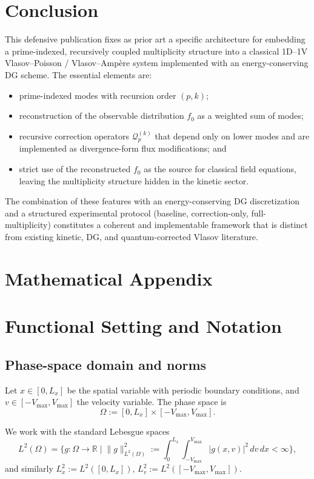 \documentclass[11pt]{article}
\begin{document}
\section{Conclusion}

This defensive publication fixes as prior art a specific architecture for
embedding a prime-indexed, recursively coupled multiplicity structure into a
classical 1D--1V Vlasov–Poisson / Vlasov–Amp\`ere system implemented with an
energy-conserving DG scheme. The essential elements are:
\begin{itemize}
  \item prime-indexed modes with recursion order $(p,k)$;
  \item reconstruction of the observable distribution $f_0$ as a weighted sum
        of modes;
  \item recursive correction operators $\mathcal{Q}_p^{(k)}$ that depend only
        on lower modes and are implemented as divergence-form flux
        modifications; and
  \item strict use of the reconstructed $f_0$ as the source for classical
        field equations, leaving the multiplicity structure hidden in the
        kinetic sector.
\end{itemize}
The combination of these features with an energy-conserving DG discretization
and a structured experimental protocol (baseline, correction-only,
full-multiplicity) constitutes a coherent and implementable framework that is
distinct from existing kinetic, DG, and quantum-corrected Vlasov literature.

\appendix
\section*{Mathematical Appendix}

\section{Functional Setting and Notation}

\subsection{Phase-space domain and norms}

Let $x \in [0,L_x]$ be the spatial variable with periodic boundary conditions,
and $v \in [-V_{\max}, V_{\max}]$ the velocity variable. The phase space is
\[
  \Omega := [0,L_x] \times [-V_{\max}, V_{\max}].
\]

We work with the standard Lebesgue spaces
\[
  L^2(\Omega) = \Big\{ g : \Omega \to \mathbb{R} \;\Big|\;
     \|g\|_{L^2(\Omega)}^2 := \int_0^{L_x}\int_{-V_{\max}}^{V_{\max}}
     |g(x,v)|^2\,dv\,dx < \infty \Big\},
\]
and similarly $L^2_x := L^2([0,L_x])$, $L^2_v := L^2([-V_{\max},V_{\max}])$.
\end{document}

